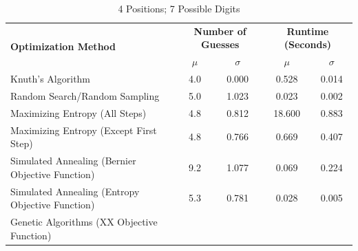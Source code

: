 \documentclass[11pt]{article}
\begin{document}
\newpage

\begin{table}[h!]
\begin{center}
\begin{tabular}{l c c c c}
\toprule
\multirow{2}{*}{\bfseries Optimization Method} 		& \multicolumn{2}{c}{\bfseries Number of Guesses} 		& \multicolumn{2}{c}{\bfseries Runtime (Seconds)}	\\
\cmidrule(lr){2-3}  \cmidrule(lr){4-5}				& $\mu$ & $\sigma$								& $\mu$ & $\sigma$							\\
\cmidrule(lr){1-5}
Knuth's Algorithm							& 4.0 & 0.000									& 0.528 & 0.014							\\
Random Search/Random Sampling				& 5.0 & 1.023									& 0.023 & 0.002							\\
Maximizing Entropy (All Steps)					& 4.8 & 0.812									& 18.600 & 0.883							\\
Maximizing Entropy (Except First Step)			& 4.8 & 0.766									& 0.669 & 0.407							\\
Simulated Annealing (Bernier Objective Function)	& 9.2 & 1.077									& 0.069 & 0.224							\\
Simulated Annealing (Entropy Objective Function)	& 5.3 & 0.781									& 0.028 & 0.005							\\
Genetic Algorithms (XX Objective Function)		& &											& &										\\
\bottomrule
\end{tabular}
\end{center}
\caption{4 Positions; 7 Possible Digits}
\label{fig:compare_4_7}
\end{table}
\end{document}
